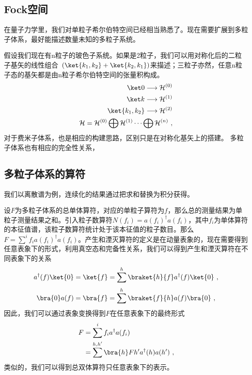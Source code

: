 \subsection{Fock空间}
在量子力学里，我们对单粒子希尔伯特空间已经相当熟悉了。现在需要扩展到多粒子体系，最好能描述数量未知的多粒子系统。

假设我们现在有n粒子的玻色子系统。如果是2粒子，我们可以用对称化后的二粒子基矢的线性组合~$(\ket {k_1,k_2}+\ket {k_2,k_1})$来描述；三粒子亦然，任意n粒子态的基矢都是由n粒子希尔伯特空间的张量积构成。
\begin{align}
\ket 0 \longrightarrow \mathcal{H}^{(0)} \\
\ket k \longrightarrow \mathcal{H}^{(1)} \\
\ket {k_1,k_2}\longrightarrow \mathcal{H}^{(2)}\\
\mathcal{H}=\mathcal{H}^{(0)} \bigoplus \mathcal{H}^{(1)} \cdots \bigoplus \mathcal{H}^{(n)}~,
\end{align}
对于费米子体系，也是相应的构建思路，区别只是在对称化基矢上的搭建。
多粒子体系也有相应的完全性关系，

\subsection{多粒子体系的算符}
我们以离散谱为例，连续化的结果通过把求和替换为积分获得。

设$ F$为多粒子体系的总单体算符，对应的单粒子算符为$f$，那么总的测量结果为单粒子测量结果之和。引入粒子数算符$N(f_i)=a(f_i)^\dagger a(f_i)$，其中${f_i}$为单体算符的本征值谱，该粒子数算符统计处于该本征值的粒子数目。那么$F=\sum ^i f_i a(f_i)^\dagger a(f_i) $。产生和湮灭算符的定义是在动量表象的，现在需要得到任意表象下的形式，利用真空态和完备性关系，我们可以得到产生和湮灭算符在不同表象下的关系
\begin{equation}
a^{\dagger}(f)\ket{0}=\ket{f}=\sum ^{h}\braket{h}{f}a^{\dagger}(f)\ket{0}~,
\end{equation}
\begin{equation}
\bra{0}a(f)=\bra{f}=\sum^{h}\braket{f}{h}a(f)\bra{0}~,
\end{equation}
因此，我们可以通过表象变换得到$F$在任意表象下的最终形式
\begin{equation}
\begin{aligned}
F&=\sum^i f_i a^\dagger a(f_i)\\
&=\sum^{h,h'}\bra{h}F{h'}a^\dagger(h)a(h')~,
\end{aligned}
\end{equation}
类似的，我们可以得到总双体算符只任意表象下的表示。

